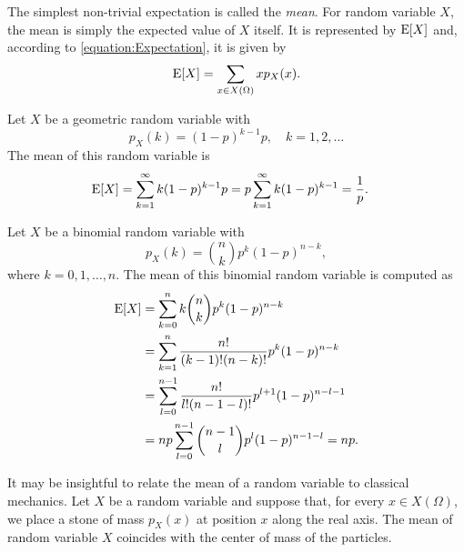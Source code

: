 The simplest non-trivial expectation is called the \emph{mean}.
For random variable $X$, the mean is simply the expected value of $X$ itself.
It is represented by $\mathrm{E} [X]$ and, according to \eqref{equation:Expectation}, it is given by
\begin{equation*}
\mathrm{E} [X] = \sum_{x \in X(\Omega)} x p_X (x) .
\end{equation*}

\begin{example}
Let $X$ be a geometric random variable with
\begin{equation*}
p_X (k) = (1-p)^{k-1} p, \quad k = 1, 2, \ldots
\end{equation*}
The mean of this random variable is
\begin{equation*}
\begin{split}
\mathrm{E} [X] &= \sum_{k=1}^{\infty} k (1-p)^{k-1} p
= p \sum_{k=1}^{\infty} k (1-p)^{k-1}
= \frac{1}{p} .
\end{split}
\end{equation*}
\end{example}

\begin{example}
Let $X$ be a binomial random variable with
\begin{equation*}
p_X (k) = \binom{n}{k} p^k (1-p)^{n-k} ,
\end{equation*}
where $k = 0, 1, \ldots, n$.
The mean of this binomial random variable is computed as
\begin{equation*}
\begin{split}
\mathrm{E} [X] &= \sum_{k=0}^n k \binom{n}{k} p^k (1-p)^{n-k} \\
&= \sum_{k=1}^n \frac{n!}{(k-1)!(n-k)!} p^k (1-p)^{n-k} \\
&= \sum_{l=0}^{n-1} \frac{n!}{l!(n-1-l)!} p^{l+1} (1-p)^{n-l-1} \\
&= n p \sum_{l=0}^{n-1} \binom{n-1}{l} p^{l} (1-p)^{n-1-l}
= n p .
\end{split}
\end{equation*}
\end{example}

It may be insightful to relate the mean of a random variable to classical mechanics.
Let $X$ be a random variable and suppose that, for every $x \in X(\Omega)$, we place a stone of mass $p_X(x)$ at position $x$ along the real axis.
The mean of random variable $X$ coincides with the center of mass of the particles.

